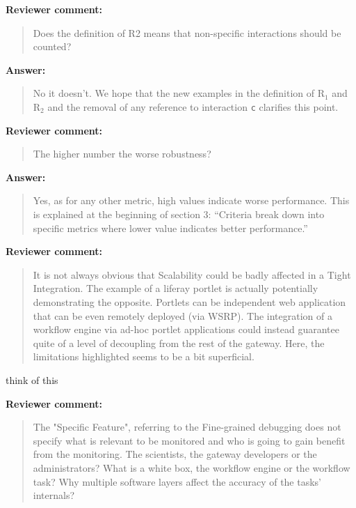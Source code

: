 \documentclass[a4]{article}
\newenvironment{review}%
{\textbf{Reviewer comment:}\begin{quote}}%
{\end{quote}}%
\newenvironment{answer}%
{\textbf{Answer:}\begin{small}\begin{quote}}%
{\end{quote}\end{small}}%
\newcommand{\todo}[1]{\color{red}#1\color{black}}
\begin{document}
\begin{review}
Does the definition of R2 means that non-specific
  interactions should be counted?
\end{review}

\begin{answer}
No it doesn't. We hope that the new examples in the definition of
R$_1$ and R$_2$ and the removal of any reference to interaction
\texttt{c} clarifies this point.
\end{answer}

\begin{review}
The higher number the worse
  robustness?
\end{review}

\begin{answer}
Yes, as for any other metric, high values indicate worse
performance. This is explained at the beginning of section 3:
``Criteria break down into specific metrics where lower value
indicates better performance.''
\end{answer}

\begin{review}
It is not always obvious that Scalability could be badly affected in a Tight Integration. The example of a liferay portlet is actually potentially demonstrating the opposite. Portlets can be independent web application that can be even remotely deployed (via WSRP). The integration of a workflow engine via ad-hoc portlet applications could instead guarantee quite of a level of decoupling from the rest of the gateway. Here, the limitations highlighted seems to be a bit superficial.
\end{review}

\todo{think of this}

\begin{review}
The "Specific Feature", referring to the Fine-grained debugging does not specify what is relevant to be monitored and who is going to gain benefit from the monitoring. The scientists, the gateway developers or the administrators? What is a white box, the workflow engine or the workflow task? Why multiple software layers affect the accuracy of the tasks' internals?
\end{review}
\end{document}
